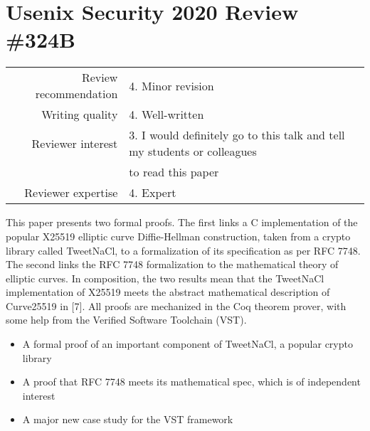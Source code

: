 \newpage
\section{Usenix Security 2020 Review \#324B}

\begin{tabular}{rl}
    \toprule
    Review recommendation & 4. Minor revision                                                        \\
    Writing quality       & 4. Well-written                                                          \\
    Reviewer interest     & 3. I would definitely go to this talk and tell my students or colleagues \\
                          & to read this paper                                                       \\
    Reviewer expertise    & 4. Expert                                                                \\
    \bottomrule
\end{tabular}

\begin{center}
\end{center}
This paper presents two formal proofs. The first links a C implementation of the popular X25519 elliptic curve Diffie-Hellman construction, taken from a crypto library called TweetNaCl, to a formalization of its specification as per RFC 7748. The second links the RFC 7748 formalization to the mathematical theory of elliptic curves. In composition, the two results mean that the TweetNaCl implementation of X25519 meets the abstract mathematical description of Curve25519 in [7]. All proofs are mechanized in the Coq theorem prover, with some help from the Verified Software Toolchain (VST).

\begin{center}
\end{center}

\begin{itemize}
    \item A formal proof of an important component of TweetNaCl, a popular crypto library
    \item A proof that RFC 7748 meets its mathematical spec, which is of independent interest
    \item A major new case study for the VST framework
\end{itemize}

